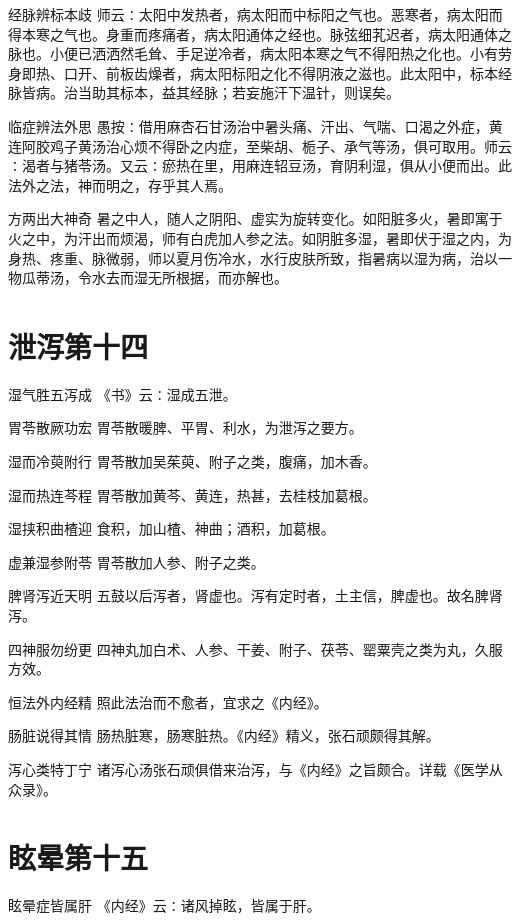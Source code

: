 \documentclass[a4paper,12pt,UTF8,twoside]{ctexbook}
\begin{document}
    经脉辨标本歧
    师云∶太阳中发热者，病太阳而中标阳之气也。恶寒者，病太阳而得本寒之气也。身重而疼痛者，病太阳通体之经也。脉弦细芤迟者，病太阳通体之脉也。小便已洒洒然毛耸、手足逆冷者，病太阳本寒之气不得阳热之化也。小有劳身即热、口开、前板齿燥者，病太阳标阳之化不得阴液之滋也。此太阳中，标本经脉皆病。治当助其标本，益其经脉；若妄施汗下温针，则误矣。
    
    临症辨法外思
    愚按∶借用麻杏石甘汤治中暑头痛、汗出、气喘、口渴之外症，黄连阿胶鸡子黄汤治心烦不得卧之内症，至柴胡、栀子、承气等汤，俱可取用。师云∶渴者与猪苓汤。又云∶瘀热在里，用麻连轺豆汤，育阴利湿，俱从小便而出。此法外之法，神而明之，存乎其人焉。
    
    方两出大神奇
    暑之中人，随人之阴阳、虚实为旋转变化。如阳脏多火，暑即寓于火之中，为汗出而烦渴，师有白虎加人参之法。如阴脏多湿，暑即伏于湿之内，为身热、疼重、脉微弱，师以夏月伤冷水，水行皮肤所致，指暑病以湿为病，治以一物瓜蒂汤，令水去而湿无所根据，而亦解也。
    
    \section{泄泻第十四}
      湿气胜五泻成
    《书》云∶湿成五泄。
    
    胃苓散厥功宏
    胃苓散暖脾、平胃、利水，为泄泻之要方。
    
    湿而冷萸附行
    胃苓散加吴茱萸、附子之类，腹痛，加木香。
    
    湿而热连芩程
    胃苓散加黄芩、黄连，热甚，去桂枝加葛根。
    
    湿挟积曲楂迎
    食积，加山楂、神曲；酒积，加葛根。
    
    虚兼湿参附苓
    胃苓散加人参、附子之类。
    
    脾肾泻近天明
    五鼓以后泻者，肾虚也。泻有定时者，土主信，脾虚也。故名脾肾泻。
    
    四神服勿纷更
    四神丸加白术、人参、干姜、附子、茯苓、罂粟壳之类为丸，久服方效。
    
    恒法外内经精
    照此法治而不愈者，宜求之《内经》。
    
    肠脏说得其情
    肠热脏寒，肠寒脏热。《内经》精义，张石顽颇得其解。
    
    泻心类特丁宁
    诸泻心汤张石顽俱借来治泻，与《内经》之旨颇合。详载《医学从众录》。
    
    
    
    \section{眩晕第十五}
    眩晕症皆属肝
    《内经》云∶诸风掉眩，皆属于肝。
    
\end{document}
